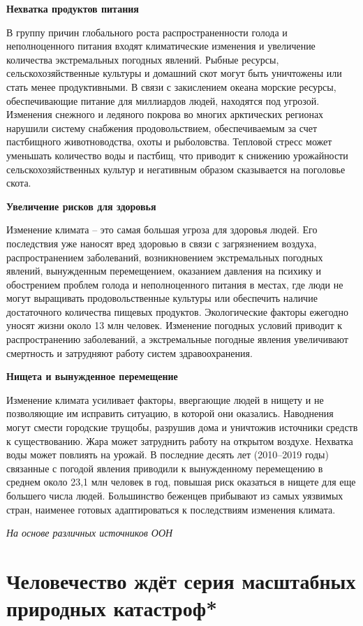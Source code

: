 \textbf{Нехватка продуктов питания}

В группу причин глобального роста распространенности голода и неполноценного питания входят климатические изменения и увеличение количества экстремальных погодных явлений. Рыбные ресурсы, сельскохозяйственные культуры и домашний скот могут быть уничтожены или стать менее продуктивными. В связи с закислением океана морские ресурсы, обеспечивающие питание для миллиардов людей, находятся под угрозой. Изменения снежного и ледяного покрова во многих арктических регионах нарушили систему снабжения продовольствием, обеспечиваемым за счет пастбищного животноводства, охоты и рыболовства. Тепловой стресс может уменьшать количество воды и пастбищ, что приводит к снижению урожайности сельскохозяйственных культур и негативным образом сказывается на поголовье скота.

\textbf{Увеличение рисков для здоровья}

Изменение климата – это самая большая угроза для здоровья людей. Его последствия уже наносят вред здоровью в связи с загрязнением воздуха, распространением заболеваний, возникновением экстремальных погодных явлений, вынужденным перемещением, оказанием давления на психику и обострением проблем голода и неполноценного питания в местах, где люди не могут выращивать продовольственные культуры или обеспечить наличие достаточного количества пищевых продуктов. Экологические факторы ежегодно уносят жизни около 13 млн человек. Изменение погодных условий приводит к распространению заболеваний, а экстремальные погодные явления увеличивают смертность и затрудняют работу систем здравоохранения.

\textbf{Нищета и вынужденное перемещение}

Изменение климата усиливает факторы, ввергающие людей в нищету и не позволяющие им исправить ситуацию, в которой они оказались. Наводнения могут смести городские трущобы, разрушив дома и уничтожив источники средств к существованию. Жара может затруднить работу на открытом воздухе. Нехватка воды может повлиять на урожай. В последние десять лет (2010–2019 годы) связанные с погодой явления приводили к вынужденному перемещению в среднем около 23,1 млн человек в год, повышая риск оказаться в нищете для еще большего числа людей. Большинство беженцев прибывают из самых уязвимых стран, наименее готовых адаптироваться к последствиям изменения климата.

\textit{На основе различных источников ООН}

\newpage
\section{Человечество ждёт серия масштабных природных катастроф*}

